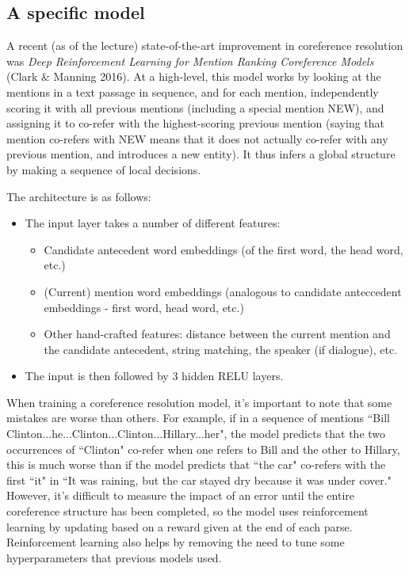 \subsection{A specific model}
A recent (as of the lecture) state-of-the-art improvement in coreference resolution was \emph{Deep Reinforcement Learning for Mention Ranking Coreference Models} (Clark \& Manning 2016). At a high-level, this model works by looking at the mentions in a text passage in sequence, and for each mention, independently scoring it with all previous mentions (including a special mention NEW), and assigning it to co-refer with the highest-scoring previous mention (saying that mention co-refers with NEW means that it does not actually co-refer with any previous mention, and introduces a new entity). It thus infers a global structure by making a sequence of local decisions.

The architecture is as follows:
\begin{itemize}
\item The input layer takes a number of different features:
\begin{itemize}
\item Candidate antecedent word embeddings (of the first word, the head word, etc.)
\item (Current) mention word embeddings (analogous to candidate anteccedent embeddings - first word, head word, etc.)
\item Other hand-crafted features: distance between the current mention and the candidate antecedent, string matching, the speaker (if dialogue), etc.
\end{itemize}
\item The input is then followed by 3 hidden RELU layers.
\end{itemize}
When training a coreference resolution model, it's important to note that some mistakes are worse than others. For example, if in a sequence of mentions ``Bill Clinton...he...Clinton...Clinton...Hillary...her", the model predicts that the two occurrences of ``Clinton" co-refer when one refers to Bill and the other to Hillary, this is much worse than if the model predicts that ``the car" co-refers with the first ``it" in ``It was raining, but the car stayed dry because it was under cover." However, it's difficult to measure the impact of an error until the entire coreference structure has been completed, so the model uses reinforcement learning by updating based on a reward given at the end of each parse. Reinforcement learning also helps by removing the need to tune some hyperparameters that previous models used.

